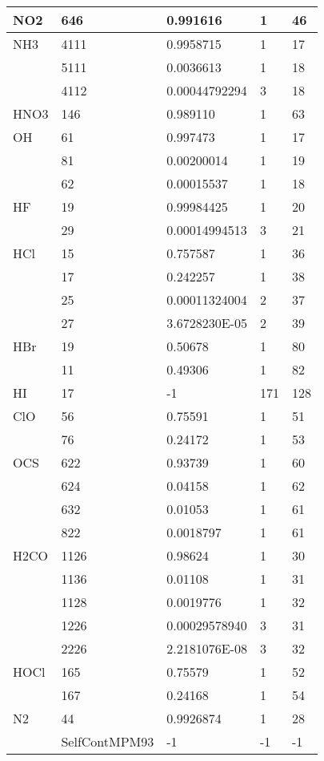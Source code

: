 \begin{longtable}{lllll}
\hline                  
  NO2& 646&  0.991616&  1&46\\
\hline                  
  NH3& 4111& 0.9958715&  1&17\\
     & 5111& 0.0036613&  1&18\\
     & 4112& 0.00044792294&  3&18\\
\hline                  
  HNO3& 146& 0.989110&  1&63\\
\hline                  
  OH& 61&  0.997473&  1&17\\
    & 81&  0.00200014&  1&19\\
    & 62&  0.00015537&  1&18\\
\hline                  
  HF& 19&  0.99984425&  1&20\\
    & 29&  0.00014994513&  3&21\\
\hline                  
  HCl& 15&  0.757587&  1&36\\
     & 17&  0.242257&  1&38\\
     & 25&  0.00011324004&  2&37\\
     & 27&  3.6728230E-05&  2&39\\
\hline                  
  HBr& 19&  0.50678&  1&80\\
     & 11&  0.49306&  1&82\\
\hline                  
  HI& 17&  -1&   171&128\\
\hline                  
  ClO& 56&  0.75591&  1&51\\
     & 76&  0.24172&  1&53\\
\hline                  
  OCS& 622&  0.93739&  1&60\\
     & 624&  0.04158&  1&62\\
     & 632&  0.01053&  1&61\\
     & 822&  0.0018797&  1&61\\
\hline                  
  H2CO& 1126&  0.98624&  1&30\\
      & 1136&  0.01108&  1&31\\
      & 1128&  0.0019776&  1&32\\
      & 1226&  0.00029578940&  3&31\\
      & 2226&  2.2181076E-08&  3&32\\
\hline                  
  HOCl& 165&  0.75579&  1&52\\
      & 167&  0.24168&  1&54\\
\hline                  
  N2& 44&  0.9926874&  1&28\\
    &SelfContMPM93&             -1      &-1     &-1\\

\end{longtable}
